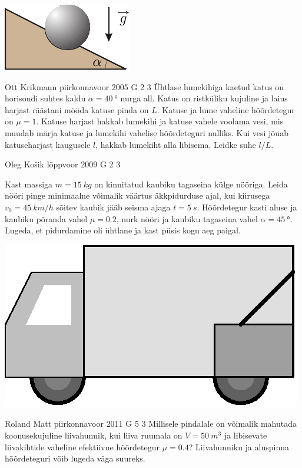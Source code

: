 \documentclass[11pt, twoside]{article}
\begin{document}
{{\begin{center}
	\includegraphics[width=0.4\linewidth]{2005-lahg-03-yl}
\end{center}
\fi
}

{Ott Krikmann} %
{piirkonnavoor} %
{2005} %
{G 2} %
{3} %
{
\ifStatement
Ühtlase lumekihiga kaetud katus on horisondi suhtes kaldu $\alpha = \SI{40}{\degree}$ nurga all. Katus on ristküliku kujuline ja laius harjast räästani mööda katuse pinda on $L$. Katuse ja lume vaheline hõõrdetegur on $\mu = \num{1}$. Katuse harjast hakkab lumekihi ja katuse vahele voolama vesi, mis muudab märja katuse ja lumekihi vahelise hõõrdeteguri nulliks. Kui vesi jõuab katuseharjast kaugusele $l$, hakkab lumekiht alla libisema. Leidke suhe $l/L$.
\fi
}

{Oleg Košik} %
{lõppvoor} %
{2009} %
{G 2} %
{3} %
{
\ifStatement
Kast massiga $m=\SI{15}{kg}$ on kinnitatud kaubiku tagaseina külge nööriga. Leida nööri pinge minimaalne võimalik väärtus äkkpidurduse ajal, kui kiirusega $v_0=\SI{45}{km/h}$ sõitev kaubik jääb seisma ajaga $t=\SI{5}{s}$. Hõõrdetegur kasti aluse ja kaubiku põranda vahel $\mu=\num{0,2}$, nurk nööri ja kaubiku tagaseina vahel $\alpha=\SI{45}{\degree}$. Lugeda, et pidurdamine oli ühtlane ja kast püsis kogu aeg paigal.
\begin{center}
	\includegraphics[width=0.5\linewidth]{2009-v3g-02-G_kast_kaubikus.eps}
\end{center}
\fi
}

{Roland Matt} %
{piirkonnavoor} %
{2011} %
{G 5} %
{3} %
{
\ifStatement
Millisele pindalale on võimalik mahutada koonusekujuline liivahunnik, kui liiva ruumala on $V=\SI{50}{m^{3}}$ ja libisevate liivakihtide vaheline efektiivne hõõrdetegur $\mu=\num{0.4}$? Liivahunniku ja aluspinna hõõrdeteguri võib lugeda väga suureks.
\fi
}

}
\end{document}
